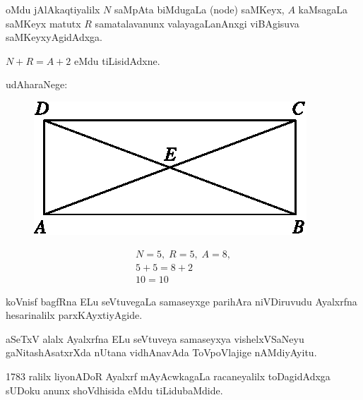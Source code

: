 oMdu jAlAkaqtiyalilx $N$ saMpAta biMdugaLa {\rm (node)} saMKeyx, $A$ kaMsagaLa saMKeyx matutx $R$ samatalavanunx valayagaLanAnxgi viBAgisuva saMKeyxyAgidAdxga.

$N+R=A+2$ eMdu tiLisidAdxne. 

udAharaNege:
\begin{figure}[H]
\begin{minipage}[c]{4cm}
\centering
\includegraphics{src/figures/m_149.eps}
\end{minipage}
\qquad\qquad 
\begin{minipage}[c]{4cm}
\begin{gather*}
N = 5, \; R=5, \; A = 8, \\
5+5 = 8+2\\
10 = 10
\end{gather*}
\end{minipage}
\end{figure}

koVnisf bagfRna ELu seVtuvegaLa samaseyxge parihAra niVDiruvudu Ayalxrfna hesarinalilx parxKAyxtiyAgide.

aSeTxV alalx Ayalxrfna ELu seVtuveya samaseyxya vishelxVSaNeyu gaNitashAsatxrXda nUtana vidhAnavAda ToVpoVlajige nAMdiyAyitu.

{\rm 1783} ralilx liyonADoR Ayalxrf mAyAcwkagaLa racaneyalilx toDagidAdxga sUDoku anunx shoVdhisida eMdu tiLidubaMdide.

